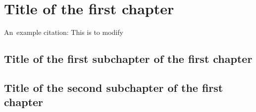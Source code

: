 \chapter{Title of the first chapter}

An~example citation: \cite{Andel07}
This is to modify

\section{Title of the first subchapter of the first chapter}

\section{Title of the second subchapter of the first chapter}
